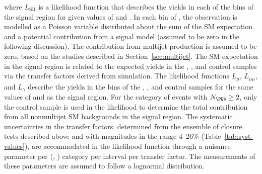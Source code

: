 where $L_\mathrm{SR}$ is a likelihood function that describes the
yields in each of the \scalht bins of the signal region for given
values of \njet and \nb.  In each bin of \scalht, the observation is
modelled as a Poisson variable distributed about the sum of the SM
expectation and a potential contribution from a signal model (assumed
to be zero in the following discussion). The contribution from
multijet production is assumed to be zero, based on the studies
described in Section~\ref{sec:multijet}.  The SM expectation in the
signal region is related to the expected yields in the \mj, \mmj, and
\gj control samples via the transfer factors derived from
simulation. The likelihood functions $L_\mu$, $L_{\mu\mu}$, and
$L_\gamma$ describe the yields in the \scalht bins of the \mj, \mmj,
and \gj control samples for the same values of \njet and \nb as the
signal region.  For the category of events with $\nb \geq 2$, only the
\mj control sample is used in the likelihood to determine the total
contribution from all nonmultijet SM backgrounds in the signal
region. The systematic uncertainties in the transfer factors,
determined from the ensemble of closure tests described above and with
magnitudes in the range 4--26\% (Table~\ref{tab:syst-values}), are
accommodated in the likelihood function through a nuisance parameter
per (\njet, \nb) category per \scalht interval per transfer
factor. The measurements of these parameters are assumed to follow a
lognormal distribution.

